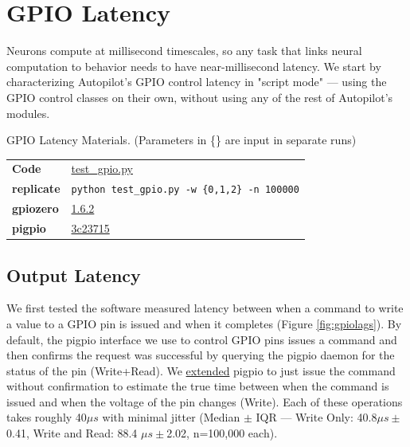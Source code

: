 \section{GPIO Latency}
\label{sec:gpiolatency}

Neurons compute at millisecond timescales, so any task that links neural computation to behavior needs to have near-millisecond latency. We start by characterizing Autopilot's GPIO control latency in "script mode" --- using the GPIO control classes on their own, without using any of the rest of Autopilot's modules.

\begin{margintable}[0cm]
\caption{GPIO Latency Materials. (Parameters in \{\} are input in separate runs)}
\label{tab:gpiomaterials}
\noindent\begin{tabularx}{\linewidth}{lX}%
\toprule
\textbf{Code} & \href{https://github.com/auto-pi-lot/plugin-paper/blob/main/plugin_paper/scripts/test_gpio.py}{test\_gpio.py} \\
\textbf{replicate} & \texttt{python test\_gpio.py -w \{0,1,2\} -n 100000}\\
\textbf{gpiozero} & \href{https://github.com/auto-pi-lot/plugin-paper/blob/main/plugin_paper/hardware/zero.py}{1.6.2} \\
\textbf{pigpio} & \href{https://github.com/sneakers-the-rat/pigpio/commit/3c237159e5995ec58cd673579bdd66a8d819b269}{3c23715} \\
\bottomrule
\end{tabularx}
\end{margintable}

\subsection{Output Latency}

We first tested the software measured latency between when a command to write a value to a GPIO pin is issued and when it completes (Figure \ref{fig:gpiolags}). By default, the pigpio interface we use to control GPIO pins issues a command and then confirms the request was successful by querying the pigpio daemon for the status of the pin (Write+Read). We \href{https://github.com/sneakers-the-rat/pigpio/commit/0782de06f0a5c092063118733ad2df9d65f1f1a0}{extended} pigpio to just issue the command without confirmation to estimate the true time between when the command is issued and when the voltage of the pin changes (Write). Each of these operations takes roughly 40$\mu s$ with minimal jitter (Median $\pm$ IQR --- Write Only: 40.8$\mu s \pm$0.41, Write and Read: 88.4 $\mu s \pm$2.02, n=100,000 each).

